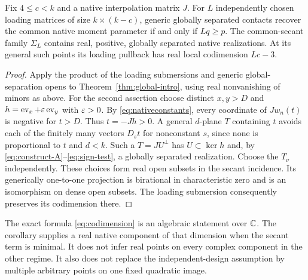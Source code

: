 \begin{corollary}\label{cor:native-multiple}
Fix $4\le c<k$ and a native interpolation matrix $J$. For $L$ independently chosen loading matrices of size $k\times(k-c)$, generic globally separated contacts recover the common native moment parameter if and only if $Lq\ge p$. The common-secant family $\Sigma_L$ contains real, positive, globally separated native realizations. At its general such points its loading pullback has real local codimension $Lc-3$.
\end{corollary}
\begin{proof}
Apply the product of the loading submersions and generic global-separation opens to Theorem~\ref{thm:global-intro}, using real nonvanishing of minors as above. For the second assertion choose distinct $x,y>D$ and $h=\operatorname{ev}_x+\varepsilon\operatorname{ev}_y$ with $\varepsilon>0$. By \eqref{eq:nativeconstants}, every coordinate of $Jw_n(t)$ is negative for $t>D$. Thus $t=-Jh>0$. A general $d$-plane $T$ containing $t$ avoids each of the finitely many vectors $D_st$ for nonconstant $s$, since none is proportional to $t$ and $d<k$. Such a $T=JU^\perp$ has $U\subset\ker h$ and, by \eqref{eq:construct-A}--\eqref{eq:sign-test}, a globally separated realization. Choose the $T_\nu$ independently. These choices form real open subsets in the secant incidence. Its generically one-to-one projection is birational in characteristic zero and is an isomorphism on dense open subsets. The loading submersion consequently preserves its codimension there.
\end{proof}
The exact formula \eqref{eq:codimension} is an algebraic statement over $\mathbb C$. The corollary supplies a real native component of that dimension when the secant term is minimal. It does not infer real points on every complex component in the other regime. It also does not replace the independent-design assumption by multiple arbitrary points on one fixed quadratic image.

